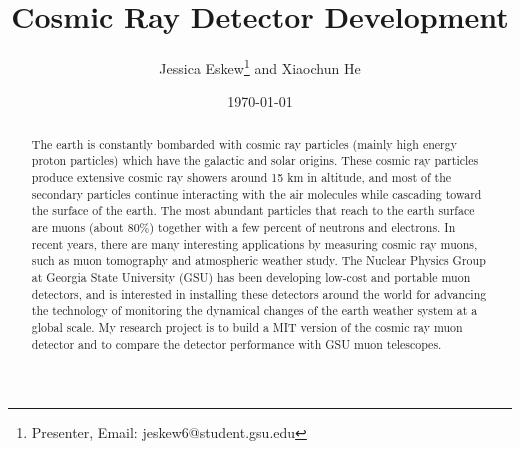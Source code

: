 \documentclass{article}
\begin{document}
\title{Cosmic Ray Detector Development}

\author{Jessica Eskew\footnote{Presenter, Email: jeskew6@student.gsu.edu} and Xiaochun He}

\date{\today}
\maketitle{}

\begin{abstract}
The earth is constantly bombarded with cosmic ray particles (mainly high energy proton particles) which have the galactic and solar origins. These cosmic ray particles produce extensive cosmic ray showers around 15 km in altitude, and most of the secondary particles continue interacting with the air molecules while cascading toward the surface of the earth. The most abundant particles that reach to the earth surface are muons (about 80\%) together with a few percent of neutrons and electrons. In recent years, there are many interesting applications by measuring cosmic ray muons, such as muon tomography and atmospheric weather study. The Nuclear Physics Group at Georgia State University (GSU) has been developing low-cost and portable muon detectors, and is interested in installing these detectors around the world for advancing the technology of monitoring the dynamical changes of the earth weather system at a global scale. My research project is to build a MIT version of the cosmic ray muon detector and to compare the detector performance with GSU muon telescopes.

\end{abstract}





\clearpage
\newpage
%
\end{document}
